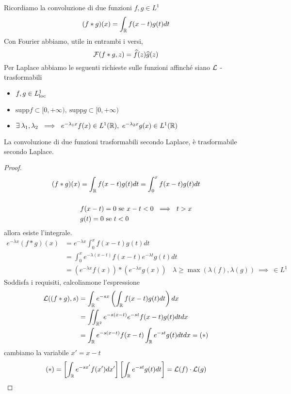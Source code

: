 Ricordiamo la convoluzione di due funzioni $f, g\in L^{1}$
\begin{equation*}
(f*g)(x) = \int_{\mathbb{R}} f(x - t) g(t) dt
\end{equation*}
Con Fourier abbiamo, utile in entrambi i versi,
\begin{equation*}
\mathcal{F}(f*g, z) = \widehat{f}(z)\widehat{g}(z)
\end{equation*}
Per Laplace abbiamo le seguenti richieste sulle funzioni affinché siano $\mathcal{L}$ - trasformabili
\begin{itemize}
\item $f, g\in L^{1}_{\operatorname{loc}}$
\item $\mathrm{supp} f\subset [0, + \infty), \ \mathrm{supp} g\subset [0, + \infty)$
\item $\exists \lambda_{1}, \lambda_{2} \ \implies \ e^{- \lambda_{1} x} f(x) \in L^{1}(\RR), \ e^{- \lambda_{2} x} g(x) \in L^{1}(\RR)$
\end{itemize}
\begin{thm}
La convoluzione di due funzioni trasformabili secondo Laplace, è trasformabile secondo Laplace.
\end{thm}
\begin{proof}
\begin{equation*}
\begin{aligned}
(f*g)(x) & = \int_{\mathbb{R}} f(x - t) g(t) dt = \int^{x}_{0} f(x - t) g(t) dt\\
 & \\
 & f(x - t) = 0\ \text{se} \ x - t < 0\ \implies \ t > x\\
 & g(t) = 0\ \text{se} \ t < 0
\end{aligned}
\end{equation*}
allora esiste l'integrale.
\begin{equation*}
\begin{aligned}
e^{- \lambda x}(f*g)(x) & = e^{- \lambda x}\int^{x}_{0} f(x - t) g(t) dt\\
 & = \int^{x}_{0} e^{- \lambda (x - t)} f(x - t) e^{- \lambda t} g(t) dt\\
 & = \left(e^{- \lambda x} f(x)\right) *\left(e^{- \lambda x} g(x)\right) \ \ \ \ \lambda \geq \max(\lambda (f), \lambda (g)) \ \implies \ \in L^{1}
\end{aligned}
\end{equation*}
Soddisfa i requisiti, calcoliamone l'espressione
\begin{align*}
\mathcal{L}((f*g), s) & = \int_{\mathbb{R}} e^{- sx}\left(\int_{\mathbb{R}} f(x - t) g(t) dt\right) dx\\
 & = \iint_{\mathbb{R}^{2}} e^{- s(x - t)} e^{- st} f(x - t) g(t) dtdx\\
 & = \int_{\mathbb{R}} e^{- s(x - t)} f(x - t)\int_{\mathbb{R}} e^{- st} g(t) dtdx = (*)
\end{align*}
cambiamo la variabile $x'= x - t$
\begin{gather*}
(*) = \left[\int_{\mathbb{R}} e^{- sx'} f(x') dx'\right]\left[\int_{\mathbb{R}} e^{- st} g(t) dt\right] = \mathcal{L}(f) \cdot \mathcal{L}(g)
\end{gather*}
\end{proof}

